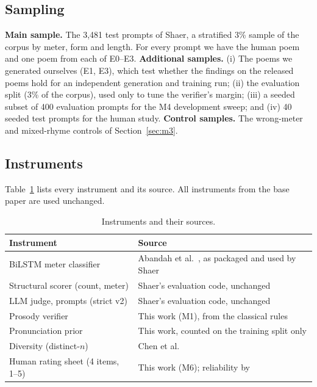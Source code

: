 \subsection{Sampling}
\textbf{Main sample.} The 3,481 test prompts of Shaer, a stratified 3\% sample of the corpus by meter, form and length.
For every prompt we have the human poem and one poem from each of E0--E3.
\textbf{Additional samples.} (i) The poems we generated ourselves (E1, E3), which test whether the findings on the
released poems hold for an independent generation and training run; (ii) the evaluation split (3\% of the corpus), used only
to tune the verifier's margin; (iii) a seeded subset of 400 evaluation prompts for the M4 development sweep; and
(iv) 40 seeded test prompts for the human study.
\textbf{Control samples.} The wrong-meter and mixed-rhyme controls of Section~\ref{sec:m3}.

\subsection{Instruments}
Table~\ref{tab:instruments} lists every instrument and its source. All instruments from the base paper are used
unchanged.

\begin{table}[t]
\centering
\caption{Instruments and their sources.}
\label{tab:instruments}
\footnotesize
\begin{tabularx}{\columnwidth}{@{}>{\raggedright\arraybackslash}p{2.6cm} >{\raggedright\arraybackslash}X@{}}
\toprule
Instrument & Source \\
\midrule
BiLSTM meter classifier & Abandah et al.~\cite{abandah2022classifying}, as packaged and used by Shaer~\cite{abbas2026shaer} \\
Structural scorer (count, meter) & Shaer's evaluation code, unchanged \\
LLM judge, prompts (strict v2) & Shaer's evaluation code, unchanged \\
Prosody verifier & This work (M1), from the classical rules~\cite{frolov2000classical} \\
Pronunciation prior & This work, counted on the training split only \\
Diversity (distinct-$n$) & Chen et al.~\cite{chen2024diversity} \\
Human rating sheet (4 items, 1--5) & This work (M6); reliability by~\cite{cronbach1951alpha,fornell1981evaluating,henseler2015htmt,hayes2007krippendorff} \\
\bottomrule
\end{tabularx}
\end{table}

